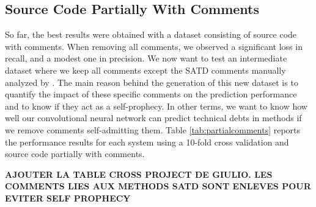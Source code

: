 
\subsection{Source Code Partially With Comments}


So far, the best results were obtained with a dataset consisting of source code with comments. When removing all comments, we observed a significant loss in recall, and a modest one in precision. We now want to test an intermediate dataset where we keep all comments except the SATD comments manually analyzed by \citet{maldonado17}. The main reason behind the generation of this new dataset is to quantify the impact of these specific comments on the prediction performance and to know if they act as a self-prophecy. In other terms, we want to know how well our convolutional neural network can predict technical debts in methods if we remove comments self-admitting them. Table \ref{tab:partialcomments} reports the performance results for each system using a 10-fold cross validation and source code partially with comments.

\textbf{AJOUTER LA TABLE CROSS PROJECT DE GIULIO. LES COMMENTS LIES AUX METHODS SATD SONT ENLEVES POUR EVITER SELF PROPHECY}

\begin{table}[t]
	\caption{Within-project prediction: results of CNN for each system using source code partially with comments}
	\label{tab:partialcomments}
	\centering\scriptsize
	\vspace{-3mm}
\end{table}

